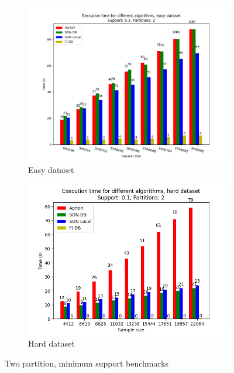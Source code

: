 \documentclass[a4paper]{article}
\begin{document}
	\begin{figure}[h]
		\centering
		\begin{subfigure}[b]{\textwidth}
			\centering
			\includegraphics[width=\textwidth]{1_easy_0,3_2_dataset.png}
         	\caption{Easy dataset}
		\end{subfigure}
		\hfill		
		\begin{subfigure}[b]{\textwidth}
			\centering
			\includegraphics[width=\textwidth]{1_hard_0,1_2_dataset.png}
         	\caption{Hard dataset}
		\end{subfigure}
		\hfill

		\caption{Two partition, minimum support benchmarks}
		\label{fig:2par-minsup}
		
	\end{figure}
	
\end{document}
